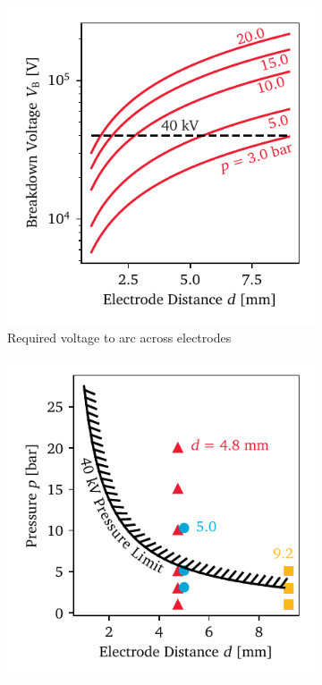             \begin{figure}[h]
                \centering
                \begin{subfigure}[t]{0.47\textwidth}
                    \centering
                    \includegraphics[width=\textwidth]{assets/3 design/pressurePaschen_final}
                    \caption{Required voltage to arc across electrodes}
                    \label{fig:paschenPressure}
                \end{subfigure}
                \hfill
                \begin{subfigure}[t]{0.47\textwidth}
                    \centering
                    \includegraphics[width=\textwidth]{assets/3 design/sparkTests_final}

\end{subfigure}
\end{figure}
